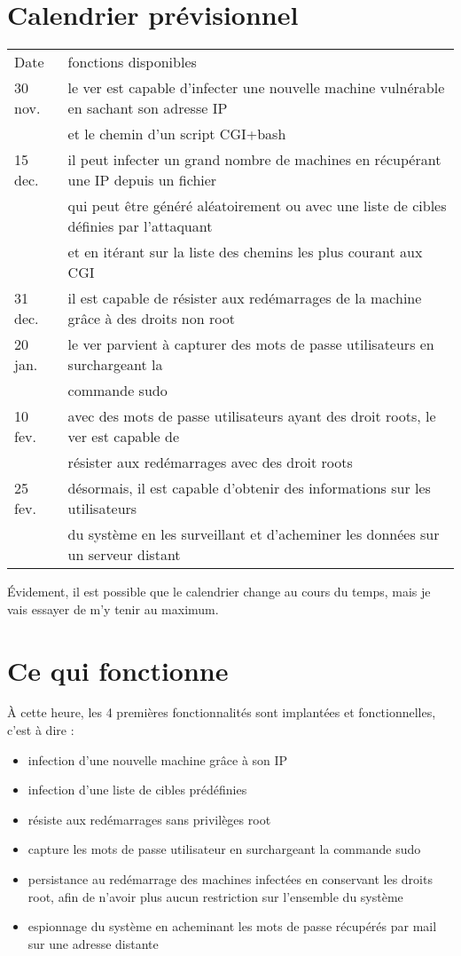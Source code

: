\documentclass[]{projet-M1}
\begin{document}
\section{Calendrier prévisionnel}
\begin{tabular}{| l || l |}
	\hline
	Date & fonctions disponibles  \\ \hhline{|=||=|}
	30 nov. & le ver est capable d'infecter une nouvelle machine vulnérable en sachant son adresse IP \\ & et le chemin d'un script \gls{CGI}+\gls{bash} 	\\ \hline
	15 dec. & il peut infecter un grand nombre de machines en récupérant une IP depuis un fichier \\ & qui peut être généré aléatoirement ou avec une liste de cibles définies par l'attaquant \\
	& et en itérant sur la liste des chemins les plus courant aux \gls{CGI}\\ \hline
	31 dec. & il est capable de résister aux redémarrages de la machine grâce à des droits non root \\ \hline
	20 jan. & le ver parvient à capturer des mots de passe utilisateurs en surchargeant la  \\ & commande sudo \\ \hline
	10 fev. & avec des mots de passe utilisateurs ayant des \glspl{droit root}, le ver est capable de \\ & résister aux redémarrages avec des \glspl{droit root} \\ \hline
	25 fev. & désormais, il est capable d'obtenir des informations sur les utilisateurs  \\ & du système en les surveillant et d'acheminer les données sur un serveur distant \\ \hline
 \end{tabular}
Évidement, il est possible que le calendrier change au cours du temps, mais je vais essayer de m'y tenir au maximum.
\section{Ce qui fonctionne}
À cette heure, les 4 premières fonctionnalités sont implantées et fonctionnelles, c'est à dire : 
\begin{itemize}
\item infection d'une nouvelle machine grâce à son IP
\item infection d'une liste de cibles prédéfinies
\item résiste aux redémarrages sans privilèges root
\item capture les mots de passe utilisateur en surchargeant la commande sudo
\item persistance au redémarrage des machines infectées en conservant les droits root, afin de n'avoir plus aucun restriction sur l'ensemble du système
\item espionnage du système en acheminant les mots de passe récupérés par mail sur une adresse distante
\end{itemize}
\end{document}

